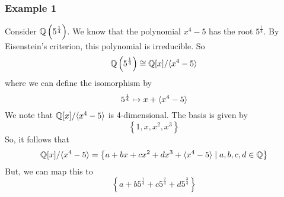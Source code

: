 \documentclass[letterpaper]{article}
\begin{document}
\subsubsection{Example 1}
Consider $\mathbb{Q}\left(5^{\frac{1}{4}}\right)$. We know that the polynomial $x^4 - 5$ has the root $5^{\frac{1}{4}}$. By Eisenstein's criterion, this polynomial is irreducible. So 
\[\mathbb{Q}\left(5^{\frac{1}{4}}\right) \cong \mathbb{Q}[x] / \langle x^4 - 5 \rangle\]
where we can define the isomorphism by 
\[5^{\frac{1}{4}} \mapsto x + \langle x^4 - 5 \rangle\]
We note that $\mathbb{Q}[x] / \langle x^4 - 5 \rangle$ is 4-dimensional. The basis is given by 
\[\left\{1, x, x^2, x^3\right\}\]
So, it follows that 
\[\mathbb{Q}[x] / \langle x^4 - 5 \rangle = \left\{a + bx + cx^2 + dx^3 + \langle x^4 - 5 \rangle \mid a, b, c, d \in \mathbb{Q}\right\}\]
But, we can map this to 
\[\left\{a + b 5^{\frac{1}{4}} + c 5^{\frac{2}{4}} + d 5^{\frac{3}{4}}\right\}\]
\end{document}
